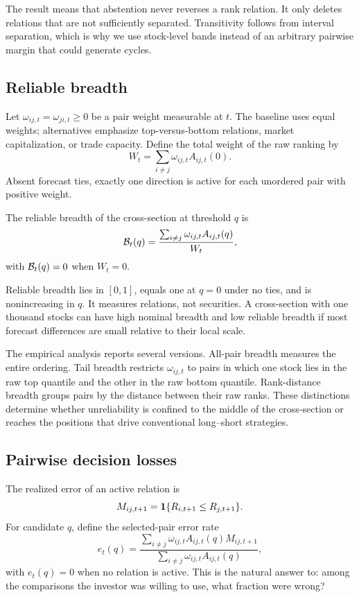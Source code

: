 The result means that abstention never reverses a rank relation. It only deletes relations that are not sufficiently separated. Transitivity follows from interval separation, which is why we use stock-level bands instead of an arbitrary pairwise margin that could generate cycles.

\subsection{Reliable breadth}

Let $\omega_{ij,t}=\omega_{ji,t}\geq0$ be a pair weight measurable at $t$. The baseline uses equal weights; alternatives emphasize top-versus-bottom relations, market capitalization, or trade capacity. Define the total weight of the raw ranking by
\[
W_t
=
\sum_{i\neq j}
\omega_{ij,t}A_{ij,t}(0).
\]
Absent forecast ties, exactly one direction is active for each unordered pair with positive weight.

\begin{definition}
The reliable breadth of the cross-section at threshold $q$ is
\begin{equation}
\mathcal B_t(q)
=
\frac{
\sum_{i\neq j}\omega_{ij,t}A_{ij,t}(q)
}{W_t},
\label{eq:reliable-breadth}
\end{equation}
with $\mathcal B_t(q)=0$ when $W_t=0$.
\end{definition}

Reliable breadth lies in $[0,1]$, equals one at $q=0$ under no ties, and is nonincreasing in $q$. It measures relations, not securities. A cross-section with one thousand stocks can have high nominal breadth and low reliable breadth if most forecast differences are small relative to their local scale.

The empirical analysis reports several versions. All-pair breadth measures the entire ordering. Tail breadth restricts $\omega_{ij,t}$ to pairs in which one stock lies in the raw top quantile and the other in the raw bottom quantile. Rank-distance breadth groups pairs by the distance between their raw ranks. These distinctions determine whether unreliability is confined to the middle of the cross-section or reaches the positions that drive conventional long--short strategies.

\subsection{Pairwise decision losses}

The realized error of an active relation is
\[
M_{ij,t+1}
=
\mathbf 1\{R_{i,t+1}\leq R_{j,t+1}\}.
\]
For candidate $q$, define the selected-pair error rate
\begin{equation}
e_t(q)
=
\frac{
\sum_{i\neq j}\omega_{ij,t}A_{ij,t}(q)M_{ij,t+1}
}{
\sum_{i\neq j}\omega_{ij,t}A_{ij,t}(q)
},
\label{eq:selected-error}
\end{equation}
with $e_t(q)=0$ when no relation is active. This is the natural answer to: among the comparisons the investor was willing to use, what fraction were wrong?

